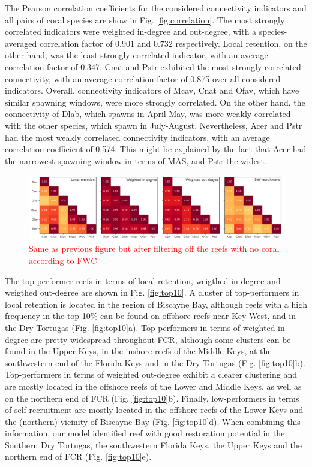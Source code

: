 \documentclass[preprint,12pt,authoryear]{elsarticle}
\begin{document}
The Pearson correlation coefficients for the considered connectivity indicators and all pairs of coral species are show  in Fig. \ref{fig:correlation}. The most strongly correlated indicators were weighted in-degree and out-degree, with a species-averaged correlation factor of $0.901$ and $0.732$ respectively. Local retention, on the other hand, was the least strongly correlated indicator, with an average correlation factor of 0.347. Cnat and Pstr exhibited the most strongly correlated connectivity, with an average correlation factor of 0.875 over all considered indicators. Overall, connectivity indicators of Mcav, Cnat and Ofav, which have similar spawning windows, were more strongly correlated. On the other hand, the connectivity of Dlab, which spawns in April-May, was more weakly correlated with the other species, which spawn in July-August. Nevertheless, Acer and Pstr had the most weakly correlated connectivity indicators, with an average correlation coefficient of 0.574. This might be explained by the fact that Acer had the narrowest spawning window in terms of MAS, and Pstr the widest.

\begin{figure}
   \centering
   \includegraphics[width=\textwidth]{figures/fig_correlation.png}
   \caption{\textcolor{red}{Same as previous figure but after filtering off the reefs with no coral according to FWC}}\label{fig:correlation_r}
\end{figure}

The top-performer reefs in terms of  local retention, weigthed in-degree and weigthed out-degree are shown in Fig. \ref{fig:top10}. A cluster of top-performers in local retention is located in the region of Biscayne Bay, although reefs with a high frequency in the top 10\% can be found on offshore reefs near Key West, and in the Dry Tortugas (Fig. \ref{fig:top10}a). Top-performers in terms of weighted in-degree are pretty widespread throughout FCR, although some clusters can be found in the Upper Keys, in the inshore reefs of the Middle Keys, at the southwestern end of the Florida Keys and in the Dry Tortugas (Fig. \ref{fig:top10}b). Top-performers in terms of weighted out-degree exhibit a clearer clustering and are mostly located in the offshore reefs of the Lower and Middle Keys, as well as on the northern end of FCR (Fig. \ref{fig:top10}b). Finally, low-performers in terms of self-recruitment are mostly located in the offshore reefs of the Lower Keys and the (northern) vicinity of Biscayne Bay (Fig. \ref{fig:top10}d). When combining this information, our model identified reef with good restoration potential in the Southern Dry Tortugas, the southwestern Florida Keys, the Upper Keys and the northern end of FCR (Fig. \ref{fig:top10}e).
\end{document}
